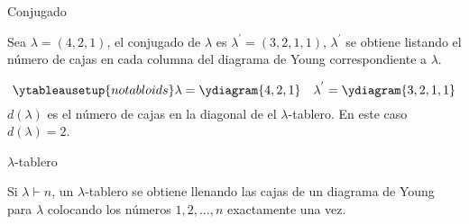 \documentclass[final,xcolor=svgnames]{beamer}
\begin{document}
\begin{frame}{}
\begin{columns}
\begin{column}{0.5\textwidth}
      \begin{block}{Conjugado}
        \begin{minipage}{0.4\linewidth}
        Sea $\lambda=(4,2,1)$, el \alert{conjugado de $\lambda$} es
        $\lambda^{'}=(3,2,1,1)$, $\lambda^{'}$ se obtiene listando el
        número de cajas en cada columna del diagrama de Young
        correspondiente a $\lambda$. 
        \end{minipage}\qquad
        \begin{minipage}{0.5\linewidth}
        \begin{equation*}
          \ytableausetup{notabloids} 
          \lambda=\ydiagram{4,2,1} \quad
          \lambda^{'}=\ydiagram{3,2,1,1}
        \end{equation*}
        $d(\lambda)$ es el número de cajas en la diagonal de el
        $\lambda$-tablero. En este caso $d(\lambda)=2$.
        \end{minipage}
      \end{block}
     
      \begin{block}{$\lambda$-tablero}
        \begin{minipage}{0.46\linewidth}
          Si $\lambda\vdash n$, un \alert{$\lambda$-tablero} se
          obtiene llenando las cajas de un diagrama de Young para
          $\lambda$ colocando los números $1,2,\ldots,n$ exactamente
          una vez.
        

\end{minipage}
\end{block}
\end{column}
\end{columns}
\end{frame}
\end{document}
